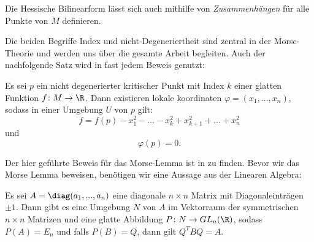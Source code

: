 Die Hessische Bilinearform lässt sich auch mithilfe von \textit{Zusammenhängen} für 
alle Punkte von $M$ definieren.

\begin{remark}
    Die beiden Begriffe Index und nicht-Degeneriertheit sind zentral in der Morse-Theorie 
    und werden uns über die gesamte Arbeit begleiten. Auch der nachfolgende Satz wird in 
    fast jedem Beweis genutzt:
\end{remark}

\begin{theorem}
    \label{satz: morse-lemma}
    Es sei $p$ ein nicht degenerierter kritischer Punkt mit Index $k$ einer glatten 
    Funktion $f \colon M \to \R$. Dann existieren lokale koordinaten 
    $\varphi = (x_1, ..., x_n)$, sodass in einer Umgebung $U$ von $p$ gilt:
    \[ f = f(p) - x_1^2 - ... - x_k^2 + x_{k + 1}^2 + ... + x_n^2 \]
    und 
    \[ \varphi (p) = 0. \]
\end{theorem}

Der hier geführte Beweis für das Morse-Lemma ist in \cite{hirsch} zu finden. 
Bevor wir das Morse Lemma beweisen, benötigen wir eine Aussage aus der Linearen Algebra:

\begin{lemma}
    \label{lemma: lina lemma}
    Es sei $A = \diag(a_1, ..., a_n)$ eine diagonale $n \times n$ Matrix mit 
    Diagonaleinträgen $\pm 1$. Dann gibt es eine Umgebung $N$ von $A$ im Vektorraum der 
    symmetrischen $n \times n$ Matrizen und eine glatte Abbildung 
    $P \colon N \to GL_n(\R)$, sodass $P(A) = E_n$ und falls $P(B) = Q$, dann gilt 
    $Q^TBQ = A$.
\end{lemma}

